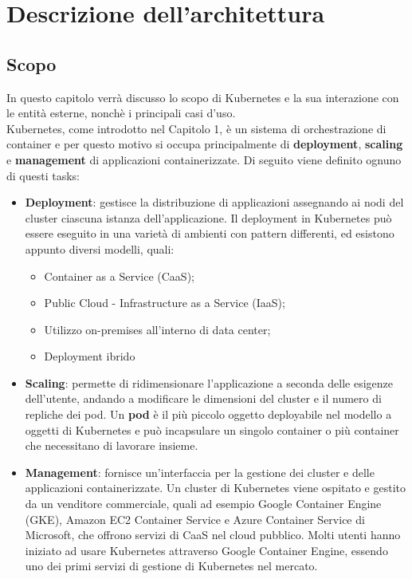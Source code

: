 \documentclass[12pt, a4paper]{report}
\begin{document}
\chapter{Descrizione dell'architettura}
\section{Scopo}
In questo capitolo verrà discusso lo scopo di Kubernetes e la sua interazione con le entità esterne, nonchè i principali casi d'uso. \\
Kubernetes, come introdotto nel Capitolo 1, è un sistema di orchestrazione di container e per questo motivo si occupa principalmente di \textbf{deployment}, \textbf{scaling} e \textbf{management} di applicazioni containerizzate. Di seguito viene definito ognuno di questi tasks:
\begin{itemize}
\item \textbf{Deployment}: gestisce la distribuzione di applicazioni assegnando ai nodi del cluster ciascuna istanza dell'applicazione. Il deployment in Kubernetes può essere eseguito in una varietà di ambienti con pattern differenti, ed esistono appunto diversi modelli, quali:
\begin{itemize}
  \item Container as a Service (CaaS);
  \item Public Cloud - Infrastructure as a Service (IaaS);
  \item Utilizzo on-premises all'interno di data center;
  \item Deployment ibrido
\end{itemize}
\item \textbf{Scaling}: permette di ridimensionare l'applicazione a seconda delle esigenze dell'utente, andando a modificare le dimensioni del cluster e il numero di repliche dei pod. Un \textbf{pod} è il più piccolo oggetto deployabile nel modello a oggetti di Kubernetes e può incapsulare un singolo container o più container che necessitano di lavorare insieme.
\item \textbf{Management}: fornisce un'interfaccia per la gestione dei cluster e delle applicazioni containerizzate. Un cluster di Kubernetes viene ospitato e gestito da un venditore commerciale, quali ad esempio Google Container Engine (GKE), Amazon EC2 Container Service e Azure Container Service di Microsoft, che offrono servizi di CaaS nel cloud pubblico. Molti utenti hanno iniziato ad usare Kubernetes attraverso Google Container Engine, essendo uno dei primi servizi di gestione di Kubernetes nel mercato.
\end{itemize}
\end{document}

